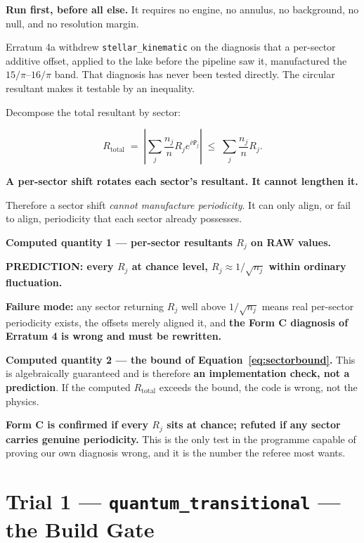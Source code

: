 \documentclass[11pt, letterpaper, openany]{book}
\begin{document}
\textbf{Run first, before all else.} It requires no engine, no annulus, no background, no null,
and no resolution margin.

Erratum 4a withdrew \texttt{stellar\_kinematic} on the diagnosis that a per-sector additive
offset, applied to the lake before the pipeline saw it, manufactured the $15/\pi$--$16/\pi$
band. That diagnosis has never been tested directly. The circular resultant makes it testable
by an inequality.

Decompose the total resultant by sector:

\begin{equation}
R_{\text{total}} \;=\; \left| \sum_j \frac{n_j}{n} R_j e^{i\Psi_j} \right|
\;\le\; \sum_j \frac{n_j}{n} R_j .
\label{eq:sectorbound}
\end{equation}

\begin{signalbox}
\textbf{A per-sector shift rotates each sector's resultant. It cannot lengthen it.}

\medskip
\noindent Therefore a sector shift \emph{cannot manufacture periodicity}. It can only align, or
fail to align, periodicity that each sector already possesses.
\end{signalbox}

\begin{predictionbox}
\textbf{Computed quantity 1 --- per-sector resultants $R_j$ on RAW values.}

\textbf{PREDICTION: every $R_j$ at chance level, $R_j \approx 1/\sqrt{n_j}$ within ordinary
fluctuation.}

\textbf{Failure mode:} any sector returning $R_j$ well above $1/\sqrt{n_j}$ means real
per-sector periodicity exists, the offsets merely aligned it, and \textbf{the Form C diagnosis
of Erratum 4 is wrong and must be rewritten.}

\medskip
\textbf{Computed quantity 2 --- the bound of Equation~\ref{eq:sectorbound}.} This is
algebraically guaranteed and is therefore \textbf{an implementation check, not a prediction}. If
the computed $R_{\text{total}}$ exceeds the bound, the code is wrong, not the physics.
\end{predictionbox}

\textbf{Form C is confirmed if every $R_j$ sits at chance; refuted if any sector carries genuine
periodicity.} This is the only test in the programme capable of proving our own diagnosis wrong,
and it is the number the referee most wants.

\section{Trial 1 --- \texttt{quantum\_transitional} --- the Build Gate}
\end{document}
